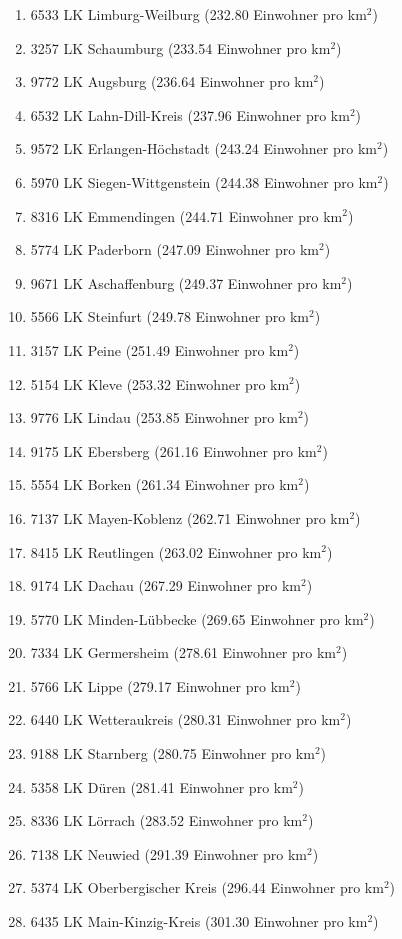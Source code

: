 \begin{enumerate}[itemsep=-6mm]
\item 6533 LK Limburg-Weilburg (232.80 Einwohner pro km$^2$)
\item 3257 LK Schaumburg (233.54 Einwohner pro km$^2$)
\item 9772 LK Augsburg (236.64 Einwohner pro km$^2$)
\item 6532 LK Lahn-Dill-Kreis (237.96 Einwohner pro km$^2$)
\item 9572 LK Erlangen-Höchstadt (243.24 Einwohner pro km$^2$)
\item 5970 LK Siegen-Wittgenstein (244.38 Einwohner pro km$^2$)
\item 8316 LK Emmendingen (244.71 Einwohner pro km$^2$)
\item 5774 LK Paderborn (247.09 Einwohner pro km$^2$)
\item 9671 LK Aschaffenburg (249.37 Einwohner pro km$^2$)
\item 5566 LK Steinfurt (249.78 Einwohner pro km$^2$)
\item 3157 LK Peine (251.49 Einwohner pro km$^2$)
\item 5154 LK Kleve (253.32 Einwohner pro km$^2$)
\item 9776 LK Lindau (253.85 Einwohner pro km$^2$)
\item 9175 LK Ebersberg (261.16 Einwohner pro km$^2$)
\item 5554 LK Borken (261.34 Einwohner pro km$^2$)
\item 7137 LK Mayen-Koblenz (262.71 Einwohner pro km$^2$)
\item 8415 LK Reutlingen (263.02 Einwohner pro km$^2$)
\item 9174 LK Dachau (267.29 Einwohner pro km$^2$)
\item 5770 LK Minden-Lübbecke (269.65 Einwohner pro km$^2$)
\item 7334 LK Germersheim (278.61 Einwohner pro km$^2$)
\item 5766 LK Lippe (279.17 Einwohner pro km$^2$)
\item 6440 LK Wetteraukreis (280.31 Einwohner pro km$^2$)
\item 9188 LK Starnberg (280.75 Einwohner pro km$^2$)
\item 5358 LK Düren (281.41 Einwohner pro km$^2$)
\item 8336 LK Lörrach (283.52 Einwohner pro km$^2$)
\item 7138 LK Neuwied (291.39 Einwohner pro km$^2$)
\item 5374 LK Oberbergischer Kreis (296.44 Einwohner pro km$^2$)
\item 6435 LK Main-Kinzig-Kreis (301.30 Einwohner pro km$^2$)

\end{enumerate}
